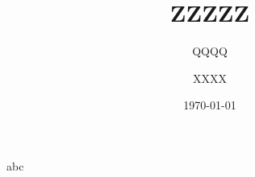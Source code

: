 \documentclass[t,compress]{beamer}
\title{ZZZZZ}
\subtitle{QQQQ}
\author{XXXX}
\institute{YYYY}
\date{\today}
\begin{document}
    \begin{frame}
        abc
    \end{frame}
\end{document}
